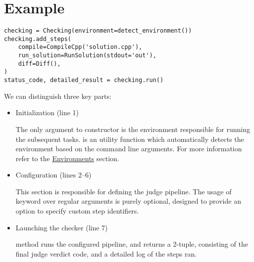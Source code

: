 \section{Example}\label{sec:example}

\begin{verbatim}
checking = Checking(environment=detect_environment())
checking.add_steps(
    compile=CompileCpp('solution.cpp'),
    run_solution=RunSolution(stdout='out'),
    diff=Diff(),
)
status_code, detailed_result = checking.run()
\end{verbatim}

We can distinguish three key parts:
\begin{itemize}
    \item Initialization (line 1)

    The only argument to  constructor is the environment responsible for running
    the subsequent tasks.
    \hyperref[sec:detect_environment]{} is an utility function which automatically detects the environment
    based on the command line arguments.
    For more information refer to the \hyperref[sec:environments]{Environments} section.
    \item Configuration (lines 2--6)

    This section is responsible for defining the judge pipeline.
    The usage of keyword over regular arguments is purely optional, designed to provide an option to specify
    custom step identifiers.
    \item Launching the checker (line 7)

     method runs the configured pipeline, and returns a 2-tuple, consisting of the final
    judge verdict code, and a detailed log of the steps ran.
\end{itemize}
